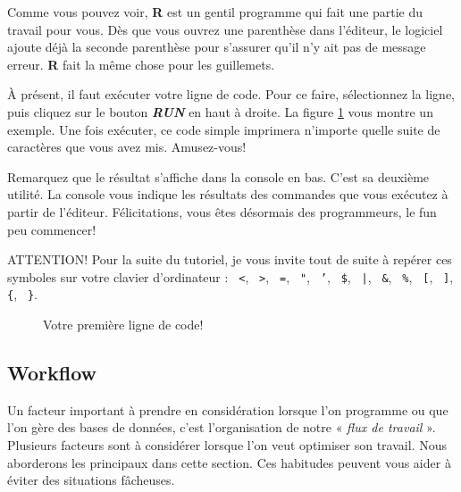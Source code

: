\documentclass[10.5pt,a4paper]{article}
\newcommand{\rcode}[1]{\texttt{\color{rstudio} #1}}
\begin{document}
 Comme vous pouvez voir, \textbf{R} est un gentil programme qui fait une partie du travail pour vous. Dès que vous ouvrez une parenthèse dans l'éditeur, le logiciel ajoute déjà la seconde parenthèse pour s'assurer qu'il n'y ait pas de message erreur. \textbf{R} fait la même chose pour les guillemets. 
   
À présent, il faut exécuter votre ligne de code. Pour ce faire, sélectionnez la ligne, puis cliquez sur le bouton \textit{\textbf{RUN}} en haut à droite. La figure \ref{rstudio4} vous montre un exemple. Une fois exécuter, ce code simple imprimera n'importe quelle suite de caractères que vous avez mis. Amusez-vous!

Remarquez que le résultat s'affiche dans la console en bas. C'est sa deuxième utilité. La console vous indique les résultats des commandes que vous exécutez à partir de l'éditeur. Félicitations, vous êtes désormais des programmeurs, le fun peu commencer! 

ATTENTION! Pour la suite du tutoriel, je vous invite tout de suite à repérer ces symboles sur votre clavier d'ordinateur : \rcode{<}, \rcode{>}, \rcode{=}, \rcode{"}, \rcode{'}, \rcode{\$}, \rcode{|}, \rcode{\&}, \rcode{\%}, \rcode{[}, \rcode{]}, \rcode{\{}, \rcode{\}}.

\begin{figure}[H]
  \centering
  \caption{Votre première ligne de code!}
  \label{rstudio4}
\end{figure}

  \subsection{Workflow}
  
  Un facteur important à prendre en considération lorsque l'on programme ou que l'on gère des bases de données, c'est l'organisation de notre « \emph{flux de travail} ». Plusieurs facteurs sont à considérer lorsque l'on veut optimiser son travail. Nous aborderons les principaux dans cette section. Ces habitudes peuvent vous aider à éviter des situations fâcheuses.
  
\end{document}
